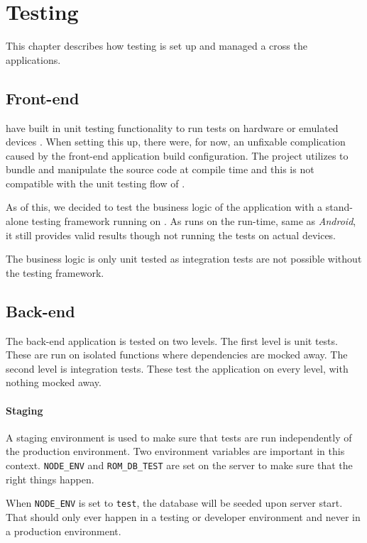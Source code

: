 \chapter{Testing}
This chapter describes how testing is set up and managed a cross the applications.

\section{Front-end}
 have built in unit testing functionality to run tests on hardware or emulated devices \citep{testing:nativescript}.
When setting this up, there were, for now, an unfixable complication caused by the front-end application build configuration.
The project utilizes  to bundle and manipulate the source code at compile time and this is not compatible with the  unit testing flow of .

As of this, we decided to test the business logic of the application with a stand-alone testing framework running on .
As  runs on the  run-time, same as \textit{Android}, it still provides valid results though not running the tests on actual devices.

The business logic is only unit tested as integration tests are not possible without the  testing framework.

\section{Back-end}
The back-end application is tested on two levels.
The first level is unit tests.
These are run on isolated functions where dependencies are mocked away.
The second level is integration tests.
These test the application on every level, with nothing mocked away. 

\subsubsection{Staging}
\label{sec:staging}
A staging environment is used to make sure that tests are run independently of the production environment. 
Two environment variables are important in this context.
\verb+NODE_ENV+ and \verb+ROM_DB_TEST+ are set on the  server to make sure that the right things happen.

When \verb+NODE_ENV+ is set to \verb+test+, the database will be seeded upon server start.
That should only ever happen in a testing or developer environment and never in a production environment.

